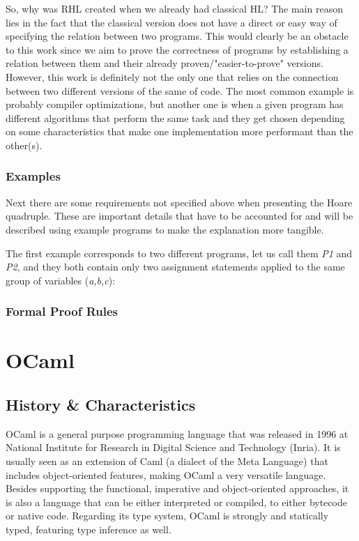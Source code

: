 {So, why was RHL created when we already had classical HL? 
The main reason lies in the fact that the classical version does not have a direct or easy way of specifying the relation between two programs. 
This would clearly be an obstacle to this work since we aim to prove the correctness of programs by establishing a relation between them and their already proven/"easier-to-prove" versions.
However, this work is definitely not the only one that relies on the connection between two different versions of the same of code.
The most common example is probably compiler optimizations, but another one is when a given program has different algorithms that perform the same task and they get chosen depending on some characteristics that make one implementation more performant than the other(s).


\subsubsection{Examples}
\label{sub:relational_hoare_logic_examples}

Next there are some requirements not specified above when presenting the Hoare quadruple.
These are important details that have to be accounted for and will be described using example programs to make the explanation more tangible.

The first example corresponds to two different programs, let us call them \emph{P1} and \emph{P2}, and they both contain only two assignment statements applied to the same group of variables (\emph{a,b,c}): 



\subsubsection{Formal Proof Rules}
\label{sub:relational_hoare_logic_formal_proof_rules}




\section{OCaml}
\label{sec:ocaml}

\subsection{History \& Characteristics} 
\label{sub:overview}

OCaml is a general purpose programming language that was released in 1996 at National Institute for Research in Digital Science and Technology (Inria).
It is usually seen as an extension of Caml (a dialect of the Meta Language) that includes object-oriented features, making OCaml a very versatile language.
Besides supporting the functional, imperative and object-oriented approaches, it is also a language that can be either interpreted or compiled, to either bytecode or native code. 
Regarding its type system, OCaml is strongly and statically typed, featuring type inference as well.

}
